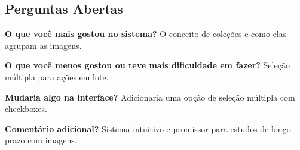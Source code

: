 \subsection*{Perguntas Abertas}
\textbf{O que você mais gostou no sistema?} O conceito de coleções e como elas agrupam as imagens.

\textbf{O que você menos gostou ou teve mais dificuldade em fazer?} Seleção múltipla para ações em lote.

\textbf{Mudaria algo na interface?} Adicionaria uma opção de seleção múltipla com checkboxes.

\textbf{Comentário adicional?} Sistema intuitivo e promissor para estudos de longo prazo com imagens.

